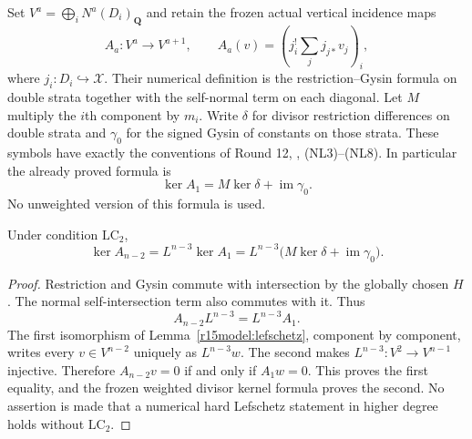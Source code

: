 Set $V^a=\bigoplus_i N^a(D_i)_{\mathbf Q}$ and retain the
frozen actual vertical incidence maps
\[
 A_a:V^a\longrightarrow V^{a+1},\qquad
 A_a(v)=\left(j_i^!\sum_j j_{j*}v_j\right)_i,
\tag{LW15.4}\label{r15model:A}
\]
where $j_i:D_i\hookrightarrow\mathcal X$.
Their numerical definition is the restriction--Gysin formula on
double strata together with the self-normal term on each diagonal.
Let $M$ multiply the $i$th component by $m_i$.
Write $\delta$ for divisor restriction differences on double
strata and $\gamma_0$ for the signed Gysin of constants on those
strata.  These symbols have exactly the conventions of Round 12,
,
(NL3)--(NL8).  In particular the already proved formula is
\[
                  \ker A_1=M\ker\delta+\operatorname{im}\gamma_0.
\tag{LW15.5}\label{r15model:old-kernel}
\]
No unweighted version of this formula is used.

\begin{lemma}
\label{r15model:kernel}
Under condition $\mathrm{LC}_2$,
\[
 \ker A_{n-2}
   = L^{n-3}\ker A_1
   = L^{n-3}\bigl(M\ker\delta+\operatorname{im}\gamma_0\bigr).
\tag{LW15.6}\label{r15model:kernel-reduction}
\]
\end{lemma}

\begin{proof}
Restriction and Gysin commute with intersection by the globally
chosen $H$.  The normal self-intersection term also commutes with
it.  Thus
\[
             A_{n-2}L^{n-3}=L^{n-3}A_1.
\]
The first isomorphism of Lemma~\ref{r15model:lefschetz}, component
by component, writes every $v\in V^{n-2}$ uniquely as $L^{n-3}w$.
The second makes $L^{n-3}:V^2\to V^{n-1}$ injective.  Therefore
$A_{n-2}v=0$ if and only if $A_1w=0$.
This proves the first equality, and the frozen weighted divisor
kernel formula proves the second.  No assertion is made that a
numerical hard Lefschetz statement in higher degree holds without
$\mathrm{LC}_2$.
\end{proof}

